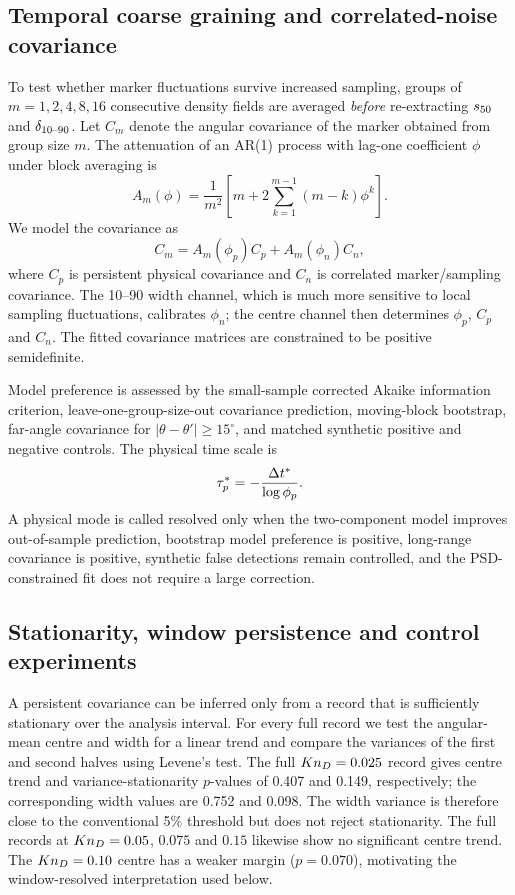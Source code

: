 \subsection{Temporal coarse graining and correlated-noise covariance}
To test whether marker fluctuations survive increased sampling, groups of $m=1,2,4,8,16$ consecutive density fields are averaged \emph{before} re-extracting $s_{50}$ and $\delta_{10\text{--}90}$. Let $C_m$ denote the angular covariance of the marker obtained from group size $m$. The attenuation of an AR(1) process with lag-one coefficient $\phi$ under block averaging is
\begin{equation}
 A_m(\phi)=\frac{1}{m^2}\left[m+2\sum_{k=1}^{m-1}(m-k)\phi^k\right].
 \label{eq:attenuation}
\end{equation}
We model the covariance as
\begin{equation}
 C_m=A_m(\phi_p)C_p+A_m(\phi_n)C_n,
 \label{eq:covmodel}
\end{equation}
where $C_p$ is persistent physical covariance and $C_n$ is correlated marker/sampling covariance. The 10--90 width channel, which is much more sensitive to local sampling fluctuations, calibrates $\phi_n$; the centre channel then determines $\phi_p$, $C_p$ and $C_n$. The fitted covariance matrices are constrained to be positive semidefinite.

Model preference is assessed by the small-sample corrected Akaike information criterion, leave-one-group-size-out covariance prediction, moving-block bootstrap, far-angle covariance for $|\theta-\theta'|\geq15^\circ$, and matched synthetic positive and negative controls. The physical time scale is
\begin{equation}
 \tau_p^*=-\frac{\Delta t^*}{\log \phi_p}.
\end{equation}
A physical mode is called resolved only when the two-component model improves out-of-sample prediction, bootstrap model preference is positive, long-range covariance is positive, synthetic false detections remain controlled, and the PSD-constrained fit does not require a large correction.

\subsection{Stationarity, window persistence and control experiments}
A persistent covariance can be inferred only from a record that is sufficiently stationary over the analysis interval. For every full record we test the angular-mean centre and width for a linear trend and compare the variances of the first and second halves using Levene's test. The full $Kn_D=0.025$ record gives centre trend and variance-stationarity $p$-values of 0.407 and 0.149, respectively; the corresponding width values are 0.752 and 0.098. The width variance is therefore close to the conventional 5\% threshold but does not reject stationarity. The full records at $Kn_D=0.05$, $0.075$ and $0.15$ likewise show no significant centre trend. The $Kn_D=0.10$ centre has a weaker margin ($p=0.070$), motivating the window-resolved interpretation used below.

